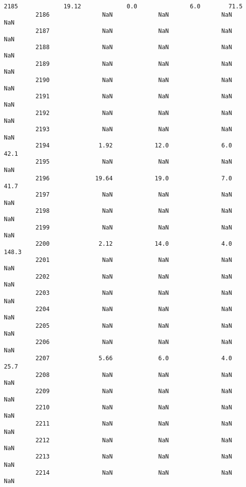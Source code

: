 \documentclass[11pt]{llncs}
\begin{document}
\begin{Verbatim}[commandchars=\\\{\}]
         2185             19.12             0.0               6.0        71.5   
         2186               NaN             NaN               NaN         NaN   
         2187               NaN             NaN               NaN         NaN   
         2188               NaN             NaN               NaN         NaN   
         2189               NaN             NaN               NaN         NaN   
         2190               NaN             NaN               NaN         NaN   
         2191               NaN             NaN               NaN         NaN   
         2192               NaN             NaN               NaN         NaN   
         2193               NaN             NaN               NaN         NaN   
         2194              1.92            12.0               6.0        42.1   
         2195               NaN             NaN               NaN         NaN   
         2196             19.64            19.0               7.0        41.7   
         2197               NaN             NaN               NaN         NaN   
         2198               NaN             NaN               NaN         NaN   
         2199               NaN             NaN               NaN         NaN   
         2200              2.12            14.0               4.0       148.3   
         2201               NaN             NaN               NaN         NaN   
         2202               NaN             NaN               NaN         NaN   
         2203               NaN             NaN               NaN         NaN   
         2204               NaN             NaN               NaN         NaN   
         2205               NaN             NaN               NaN         NaN   
         2206               NaN             NaN               NaN         NaN   
         2207              5.66             6.0               4.0        25.7   
         2208               NaN             NaN               NaN         NaN   
         2209               NaN             NaN               NaN         NaN   
         2210               NaN             NaN               NaN         NaN   
         2211               NaN             NaN               NaN         NaN   
         2212               NaN             NaN               NaN         NaN   
         2213               NaN             NaN               NaN         NaN   
         2214               NaN             NaN               NaN         NaN   
         

\end{Verbatim}
\end{document}
